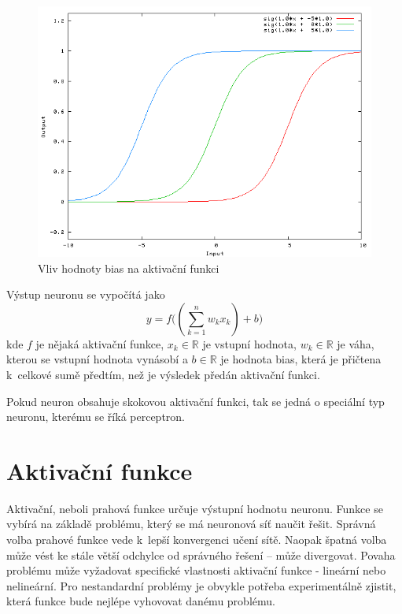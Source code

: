 \begin{figure}[H]
    \centering
    \includegraphics[scale=0.4]{obrazky-figures/bias.png}
    \caption{\label{fig:bias}Vliv hodnoty bias na aktivační funkci}
\end{figure}




Výstup neuronu se vypočítá jako
\begin{equation}
	y = f\big((\sum_{k=1}^n w_kx_k) + b\big)
\end{equation}
kde $f$ je nějaká aktivační funkce, $x_k \in \mathbb{R}$ je vstupní hodnota, $w_k \in \mathbb{R}$ je váha, kterou se vstupní hodnota vynásobí a $b \in \mathbb{R}$ je hodnota bias, která je přičtena k~celkové sumě předtím, než je výsledek předán aktivační funkci. 

Pokud neuron obsahuje skokovou aktivační funkci, tak se jedná o speciální typ neuronu, kterému se říká perceptron.


\section{Aktivační funkce}
Aktivační, neboli prahová funkce určuje výstupní hodnotu neuronu. Funkce se vybírá na základě problému, který se má neuronová síť naučit řešit. Správná volba prahové funkce vede k~lepší konvergenci učení sítě. Naopak špatná volba může vést ke stále větší odchylce od správného řešení -- může divergovat. Povaha problému může vyžadovat specifické vlastnosti aktivační funkce - lineární nebo nelineární. Pro nestandardní problémy je obvykle potřeba experimentálně zjistit, která funkce bude nejlépe vyhovovat danému problému. 

